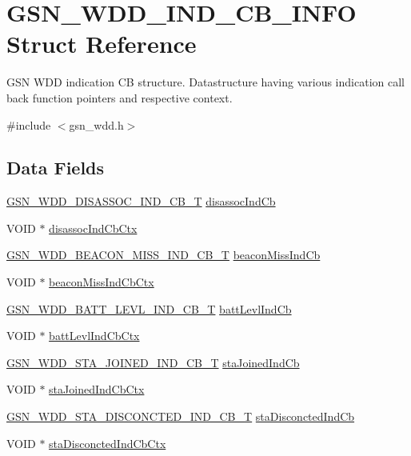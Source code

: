 \hypertarget{a00275}{
\section{GSN\_\-WDD\_\-IND\_\-CB\_\-INFO Struct Reference}
\label{a00275}
}


GSN WDD indication CB structure. Datastructure having various indication call back function pointers and respective context.  




{\ttfamily \#include $<$gsn\_\-wdd.h$>$}

\subsection*{Data Fields}
\begin{DoxyCompactItemize}
\item 
\hyperlink{a00677_gadb536a5e296beff888ffe8f4cdc68507}{GSN\_\-WDD\_\-DISASSOC\_\-IND\_\-CB\_\-T} \hyperlink{a00275_a90f38d9c53ae0699dde558eb0b6c6931}{disassocIndCb}
\item 
VOID $\ast$ \hyperlink{a00275_abc9dc7d9709e59ccc6546967ca9987e9}{disassocIndCbCtx}
\item 
\hyperlink{a00677_ga6b4e6d07b52788c8ddf01ddaa89429ad}{GSN\_\-WDD\_\-BEACON\_\-MISS\_\-IND\_\-CB\_\-T} \hyperlink{a00275_a979444ec24c29efce9284e4f6541c3f8}{beaconMissIndCb}
\item 
VOID $\ast$ \hyperlink{a00275_a05f130bff5b7b02c381634ca36cb7b6e}{beaconMissIndCbCtx}
\item 
\hyperlink{a00677_gae1fd7b71fd69db9cad751f084daf2199}{GSN\_\-WDD\_\-BATT\_\-LEVL\_\-IND\_\-CB\_\-T} \hyperlink{a00275_a404015f695a8a45821269f2629ec01f6}{battLevlIndCb}
\item 
VOID $\ast$ \hyperlink{a00275_aa0df97ec30e3f151cd6c4a0639867479}{battLevlIndCbCtx}
\item 
\hyperlink{a00677_ga607917e8bad21deeb1564d9455d46f28}{GSN\_\-WDD\_\-STA\_\-JOINED\_\-IND\_\-CB\_\-T} \hyperlink{a00275_a585323b451f5d13712287e98adf2dd79}{staJoinedIndCb}
\item 
VOID $\ast$ \hyperlink{a00275_a3f1d1116eb48fed0ef506fb7d0b2249d}{staJoinedIndCbCtx}
\item 
\hyperlink{a00677_ga3a4ef614815eaa2e3085c2d168a1ced5}{GSN\_\-WDD\_\-STA\_\-DISCONCTED\_\-IND\_\-CB\_\-T} \hyperlink{a00275_a2dcec681e534f9f5a45bed556984acd3}{staDisconctedIndCb}
\item 
VOID $\ast$ \hyperlink{a00275_af8710bb9a42313f47d788e7d52eac7b1}{staDisconctedIndCbCtx}

\end{DoxyCompactItemize}
